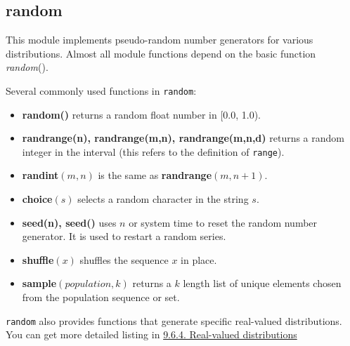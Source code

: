 \subsection{random}
This module implements pseudo-random number generators for various distributions. Almost all module functions depend on the basic function \textit{random}().

Several commonly used functions in \texttt{random}:
\begin{itemize}
\item \textbf{random()} returns a random float number in [0.0, 1.0).
\item \textbf{randrange(n), randrange(m,n), randrange(m,n,d)} returns a random integer in the interval (this refers to the definition of \texttt{range}).
\item \textbf{randint}$(m,n)$ is the same as \textbf{randrange}$(m,n+1)$.
\item \textbf{choice}$(s)$ selects a random character in the string $s$.
\item \textbf{seed(n), seed()} uses $n$ or system time to reset the random number generator. It is used to restart a random series.
\item \textbf{shuffle}$(x)$ shuffles the sequence $x$ in place.
\item \textbf{sample}$(population,k)$ returns a $k$ length list of unique elements chosen from the population sequence or set.
\end{itemize}
\texttt{random} also provides functions that generate specific real-valued distributions. You can get more detailed listing in \href{https://docs.python.org/3.6/library/random.html#real-valued-distributions}{9.6.4. Real-valued distributions}